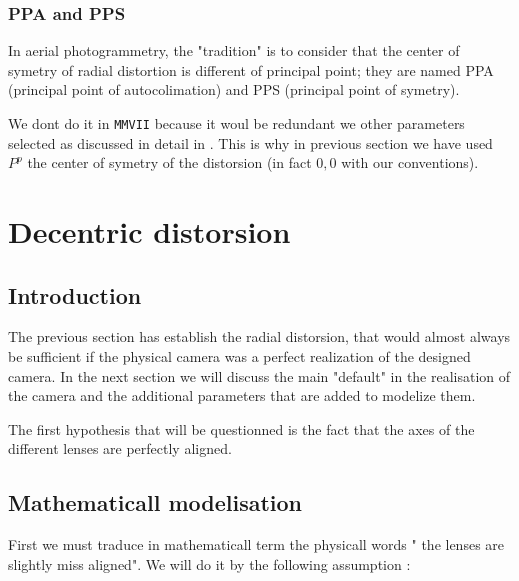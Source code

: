 
\subsubsection{PPA and PPS}

In aerial photogrammetry, the "tradition" is to consider that the center of symetry of radial distortion
is different of principal point; they are named PPA (principal point of autocolimation) and
PPS (principal point of symetry).

We dont do it in {\tt MMVII} because it woul be redundant we other parameters 
selected as discussed in detail in \label{PPA:PPS:DEC}.
This is why in previous section we have used $P^p$ the center of symetry of the distorsion 
(in fact $0,0$ with our conventions).


\section{Decentric distorsion}

\subsection{Introduction}
The previous section has establish the radial distorsion, that would almost always
be sufficient if the physical camera was a perfect realization of the designed camera.
In the next section we will discuss the main "default" in the realisation of
the camera and the additional parameters that are added to modelize them.

The first hypothesis  that will be questionned is the fact that the axes of the different
lenses are perfectly aligned.

\subsection{Mathematicall modelisation}

First we must traduce in mathematicall term the physicall words
" the lenses are slightly miss aligned".
We will do it by  the following assumption :


